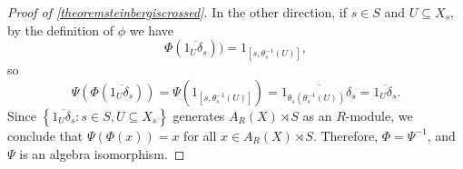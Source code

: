 \begin{proof}[Proof of \ref{theoremsteinbergiscrossed}]
In the other direction, if $s\in S$ and $U\subseteq X_s$, by the definition of $\phi$ we have
\[\Phi(\overline{1_U\delta_s}))=1_{[s,\theta_s^{-1}(U)]},\]
so
\[\Psi(\Phi(\overline{1_U\delta_s}))=\Psi(1_{[s,\theta_s^{-1}(U)]})=\overline{1_{\theta_s(\theta_s^{-1}(U))}\delta_s}=\overline{1_U\delta_s}.\]
Since $\left\{\overline{1_U\delta_s}:s\in S,U\subseteq X_s\right\}$ generates $A_R(X)\rtimes S$ as an $R$-module, we conclude that $\Psi(\Phi(x))=x$ for all $x\in A_R(X)\rtimes S$. Therefore, $\Phi=\Psi^{-1}$, and $\Psi$ is an algebra isomorphism.\qedhere
%


\end{proof}
